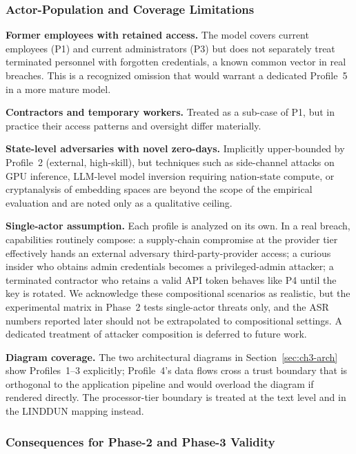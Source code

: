 \documentclass[12pt,a4paper]{report}
\begin{document}
\subsubsection{Actor-Population and Coverage Limitations}

\begin{limitbox}
\textbf{Former employees with retained access.} The model covers current
employees (P1) and current administrators (P3) but does not separately
treat terminated personnel with forgotten credentials, a known common
vector in real breaches. This is a recognized omission that would warrant
a dedicated Profile~5 in a more mature model.

\textbf{Contractors and temporary workers.} Treated as a sub-case of P1,
but in practice their access patterns and oversight differ materially.

\textbf{State-level adversaries with novel zero-days.} Implicitly
upper-bounded by Profile~2 (external, high-skill), but techniques such as
side-channel attacks on GPU inference, LLM-level model inversion
requiring nation-state compute, or cryptanalysis of embedding spaces are
beyond the scope of the empirical evaluation and are noted only as a
qualitative ceiling.

\textbf{Single-actor assumption.} Each profile is analyzed on its own.
In a real breach, capabilities routinely compose: a supply-chain
compromise at the provider tier effectively hands an external adversary
third-party-provider access; a curious insider who obtains admin
credentials becomes a privileged-admin attacker; a terminated contractor
who retains a valid API token behaves like P4 until the key is rotated.
We acknowledge these compositional scenarios as realistic, but the
experimental matrix in Phase~2 tests single-actor threats only, and the
ASR numbers reported later should not be extrapolated to compositional
settings. A dedicated treatment of attacker composition is deferred to
future work.

\textbf{Diagram coverage.} The two architectural diagrams in Section~\ref{sec:ch3-arch}
show Profiles~1--3 explicitly; Profile~4's data flows cross a trust
boundary that is orthogonal to the application pipeline and would
overload the diagram if rendered directly. The processor-tier boundary
is treated at the text level and in the LINDDUN mapping instead.
\end{limitbox}

\subsubsection{Consequences for Phase-2 and Phase-3 Validity}
\end{document}
